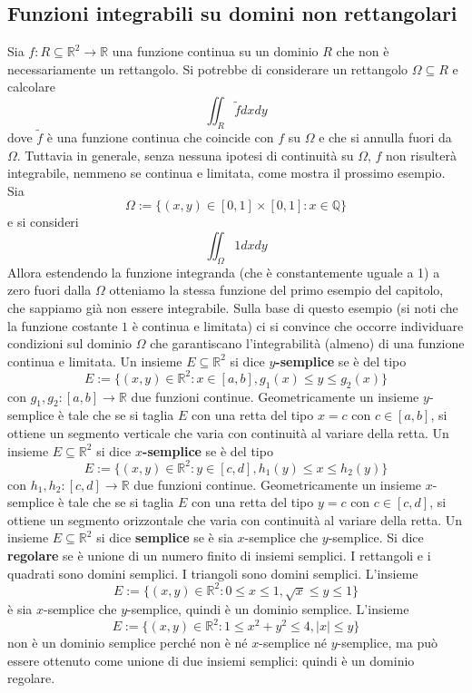 \documentclass[a4paper]{article}
\numberwithin{equation}{subsection}
\begin{document}
\subsection{Funzioni integrabili su domini non rettangolari}

Sia $f : R \subseteq \mathbb{R}^2 \rightarrow \mathbb{R}$ una funzione continua su un dominio $R$ che non è necessariamente un rettangolo.
Si potrebbe di considerare un rettangolo $\Omega \subseteq R$ e calcolare
\[\iint_R \tilde{f} dxdy\]
dove $\tilde{f}$ è una funzione continua che coincide con $f$ su $\Omega$ e che si annulla fuori da $\Omega$.
Tuttavia in generale, senza nessuna ipotesi di continuità su $\Omega$, $f$ non risulterà integrabile,
nemmeno se continua e limitata, come mostra il prossimo esempio.
\ex{}
{
    Sia
    \[\Omega := \{(x,y) \in [0,1] \times [0,1]: x \in \mathbb{Q}\}\]
    e si consideri
    \[\iint_{\Omega} 1dxdy\]
    Allora estendendo la funzione integranda (che è constantemente uguale a 1) a zero fuori dalla $\Omega$
    otteniamo la stessa funzione del primo esempio del capitolo, che sappiamo già non essere integrabile.
}
Sulla base di questo esempio (si noti che la funzione costante $1$ è continua e limitata) ci si convince
che occorre individuare condizioni sul dominio $\Omega$ che garantiscano l'integrabilità (almeno)
di una funzione continua e limitata. 
\dfn{}
{
    Un insieme $E \subseteq \mathbb{R}^2$ si dice \textbf{$y$-semplice} se è del tipo
    \[E := \{(x,y) \in \mathbb{R}^2 : x \in [a,b], g_1(x) \le y \le g_2(x)\}\]
    con $g_1, g_2 : [a,b] \rightarrow \mathbb{R}$ due funzioni continue.
}
\noindent
Geometricamente un insieme $y$-semplice è tale che se si taglia $E$ con una retta del tipo $x = c$ 
con $c \in [a,b]$, si ottiene un segmento verticale che varia con continuità al variare della retta.
\dfn{}
{
    Un insieme $E \subseteq \mathbb{R}^2$ si dice \textbf{$x$-semplice} se è del tipo
    \[E := \{(x,y) \in \mathbb{R}^2 : y \in [c,d], h_1(y) \le x \le h_2(y)\}\]
    con $h_1, h_2 : [c,d] \rightarrow \mathbb{R}$ due funzioni continue.
}
Geometricamente un insieme $x$-semplice è tale che se si taglia $E$ con una retta del tipo $y = c$
con $c \in [c,d]$, si ottiene un segmento orizzontale che varia con continuità al variare della retta.
\dfn{}
{
    Un insieme $E \subseteq \mathbb{R}^2$ si dice \textbf{semplice} se è sia $x$-semplice che $y$-semplice.
    Si dice \textbf{regolare} se è unione di un numero finito di insiemi semplici.
}
\ex{}
{
    I rettangoli e i quadrati sono domini semplici. I triangoli sono domini semplici.
    L'insieme
    \[E := \{(x,y) \in \mathbb{R}^2 : 0 \le x \le 1, \sqrt{x} \le y \le 1\}\]
    è sia $x$-semplice che $y$-semplice, quindi è un dominio semplice.
    L'insieme
    \[E := \{(x,y) \in \mathbb{R}^2 : 1 \le x^2 + y^2 \le 4, |x| \le y\}\]
    non è un dominio semplice perché non è né $x$-semplice né $y$-semplice, ma può essere ottenuto come unione di due insiemi semplici:
    quindi è un dominio regolare.
}
\end{document}
